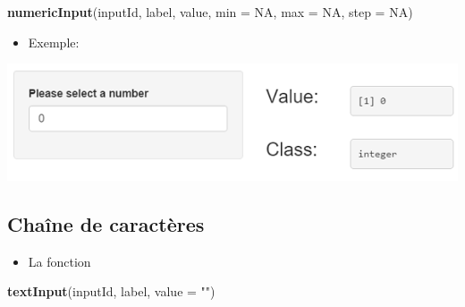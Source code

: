 \documentclass[
]{article}
\newenvironment{Shaded}{\begin{snugshade}}{\end{snugshade}}
\newcommand{\AttributeTok}[1]{\textcolor[rgb]{0.13,0.29,0.53}{#1}}
\newcommand{\CommentTok}[1]{\textcolor[rgb]{0.56,0.35,0.01}{\textit{#1}}}
\newcommand{\ConstantTok}[1]{\textcolor[rgb]{0.56,0.35,0.01}{#1}}
\newcommand{\DecValTok}[1]{\textcolor[rgb]{0.00,0.00,0.81}{#1}}
\newcommand{\FunctionTok}[1]{\textcolor[rgb]{0.13,0.29,0.53}{\textbf{#1}}}
\newcommand{\NormalTok}[1]{#1}
\newcommand{\StringTok}[1]{\textcolor[rgb]{0.31,0.60,0.02}{#1}}
\providecommand{\tightlist}{%
  \setlength{\itemsep}{0pt}\setlength{\parskip}{0pt}}
\begin{document}
\begin{Shaded}
\begin{Highlighting}[]
\FunctionTok{numericInput}\NormalTok{(inputId, label, value, }\AttributeTok{min =} \ConstantTok{NA}\NormalTok{, }\AttributeTok{max =} \ConstantTok{NA}\NormalTok{, }\AttributeTok{step =} \ConstantTok{NA}\NormalTok{)}
\end{Highlighting}
\end{Shaded}

\begin{itemize}
\tightlist
\item
  Exemple:
\end{itemize}

\begin{Shaded}
\end{Shaded}

\includegraphics{img/numeric.png}

\hypertarget{chauxeene-de-caractuxe8res}{%
\subsection{Chaîne de caractères}\label{chauxeene-de-caractuxe8res}}

\begin{itemize}
\tightlist
\item
  La fonction
\end{itemize}

\begin{Shaded}
\begin{Highlighting}[]
\FunctionTok{textInput}\NormalTok{(inputId, label, }\AttributeTok{value =} \StringTok{""}\NormalTok{)}
\end{Highlighting}
\end{Shaded}
\end{document}
